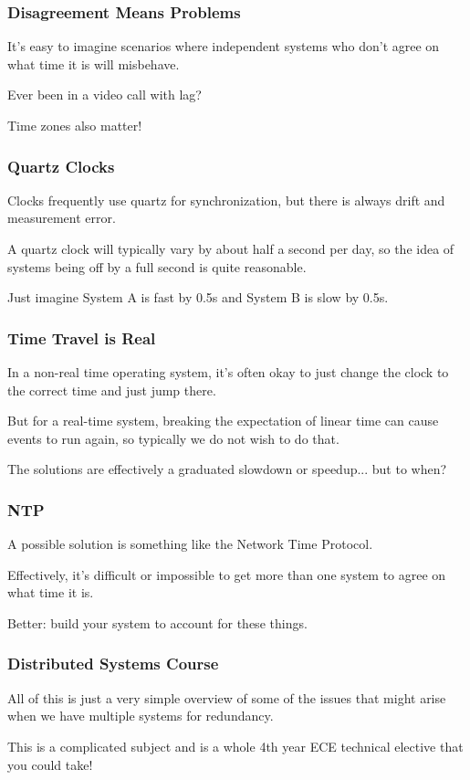 \begin{frame}
\frametitle{Disagreement Means Problems}

It's easy to imagine scenarios where independent systems who don't agree on what time it is will misbehave.

Ever been in a video call with lag?

Time zones also matter!

\end{frame}

\begin{frame}
\frametitle{Quartz Clocks}

Clocks frequently use quartz for synchronization, but there is always drift and measurement error.

A quartz clock will typically vary by about half a second per day, so the idea of systems being off by a full second is quite reasonable.


Just imagine System A is fast by 0.5s and System B is slow by 0.5s.

\end{frame}

\begin{frame}
\frametitle{Time Travel is Real}

In a non-real time operating system, it's often okay to just change the clock to the correct time and just jump there.

But for a real-time system, breaking the expectation of linear time can cause events to run again, so typically we do not wish to do that.

The solutions are effectively a graduated slowdown or speedup... but to when?

\end{frame}

\begin{frame}
\frametitle{NTP}
A possible solution is something like the Network Time Protocol.

Effectively, it's difficult or impossible to get more than one system to agree on what time it is. 

Better: build your system to account for these things.

\end{frame}

\begin{frame}
\frametitle{Distributed Systems Course}

All of this is just a very simple overview of some of the issues that might arise when we have multiple systems for redundancy. 

This is a complicated subject and is a whole 4th year ECE technical elective that you could take!


\end{frame}



